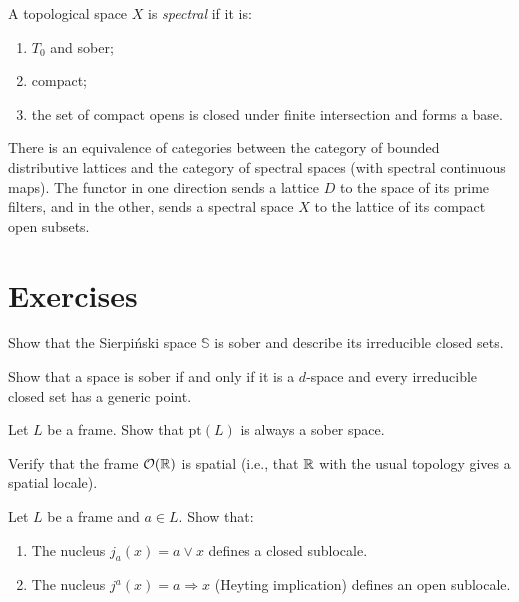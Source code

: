 \begin{definition}
A topological space $X$ is \emph{spectral} if it is:
\begin{enumerate}
  \item $T_0$ and sober;
  \item compact;
  \item the set of compact opens is closed under finite intersection and forms a base.
\end{enumerate}
\end{definition}

\begin{theorem}
There is an equivalence of categories between the category of bounded distributive lattices
and the category of spectral spaces (with spectral continuous maps). The functor in one
direction sends a lattice $D$ to the space of its prime filters, and in the other, sends a
spectral space $X$ to the lattice of its compact open subsets.
\end{theorem}

\section{Exercises}

\begin{exercise}
Show that the Sierpi\'nski space $\mathbb{S}$ is sober and describe its irreducible closed
sets.
\end{exercise}

\begin{exercise}
Show that a space is sober if and only if it is a $d$-space and every irreducible closed
set has a generic point.
\end{exercise}

\begin{exercise}
Let $L$ be a frame. Show that $\mathrm{pt}(L)$ is always a sober space.
\end{exercise}

\begin{exercise}
Verify that the frame $\mathcal{O}(\mathbb{R})$ is spatial (i.e., that $\mathbb{R}$ with the usual topology
gives a spatial locale).
\end{exercise}

\begin{exercise}
Let $L$ be a frame and $a \in L$. Show that:
\begin{enumerate}
  \item The nucleus $j_a(x) = a \vee x$ defines a closed sublocale.
  \item The nucleus $j^a(x) = a \Rightarrow x$ (Heyting implication) defines an open
    sublocale.
\end{enumerate}
\end{exercise}

